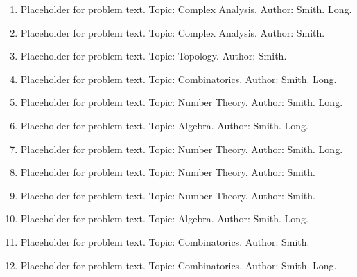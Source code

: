 \documentclass[12pt]{article}
\newcommand{\answer}[1]{} %
\newcommand{\topic}[1]{} %
\renewcommand{\author}[1]{} %
\newcommand{\isLong}[1]{} %
\begin{document}
\begin{enumerate}
\item Placeholder for problem text. Topic: Complex Analysis. Author: Smith. Long.
\answer{Answer here}
\topic{Complex Analysis}
\author{Smith}
\isLong{true}

\item Placeholder for problem text. Topic: Complex Analysis. Author: Smith. 
\answer{Answer here}
\topic{Complex Analysis}
\author{Smith}
\isLong{false}

\item Placeholder for problem text. Topic: Topology. Author: Smith. 
\answer{Answer here}
\topic{Topology}
\author{Smith}
\isLong{false}

\item Placeholder for problem text. Topic: Combinatorics. Author: Smith. Long.
\answer{Answer here}
\topic{Combinatorics}
\author{Smith}
\isLong{true}

\item Placeholder for problem text. Topic: Number Theory. Author: Smith. Long.
\answer{Answer here}
\topic{Number Theory}
\author{Smith}
\isLong{true}

\item Placeholder for problem text. Topic: Algebra. Author: Smith. Long.
\answer{Answer here}
\topic{Algebra}
\author{Smith}
\isLong{true}

\item Placeholder for problem text. Topic: Number Theory. Author: Smith. Long.
\answer{Answer here}
\topic{Number Theory}
\author{Smith}
\isLong{true}

\item Placeholder for problem text. Topic: Number Theory. Author: Smith. 
\answer{Answer here}
\topic{Number Theory}
\author{Smith}
\isLong{false}

\item Placeholder for problem text. Topic: Number Theory. Author: Smith. 
\answer{Answer here}
\topic{Number Theory}
\author{Smith}
\isLong{false}

\item Placeholder for problem text. Topic: Algebra. Author: Smith. Long.
\answer{Answer here}
\topic{Algebra}
\author{Smith}
\isLong{true}

\item Placeholder for problem text. Topic: Combinatorics. Author: Smith. 
\answer{Answer here}
\topic{Combinatorics}
\author{Smith}
\isLong{false}

\item Placeholder for problem text. Topic: Combinatorics. Author: Smith. Long.
\answer{Answer here}
\topic{Combinatorics}
\author{Smith}
\isLong{true}


\end{enumerate}
\end{document}
